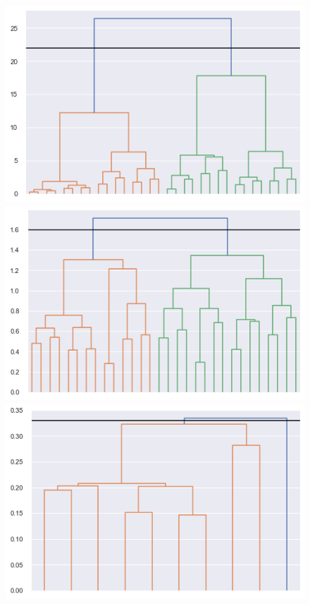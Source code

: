 \begin{figure}[h!]
	\centering
	\begin{minipage}{.50\textwidth}
		\centering
		\includegraphics[width=\textwidth]{plots/hierarchical/hierarchical_dendogram_ward.png}
	\end{minipage}%
	\begin{minipage}{.50\textwidth}
		\centering
		\includegraphics[width=\textwidth]{plots/hierarchical/hierarchical_dendogram_complete.png}
	\end{minipage}
	\begin{minipage}{.50\textwidth}
		\centering
		\includegraphics[width=\textwidth]{plots/hierarchical/hierarchical_dendogram_single.png}

\end{minipage}
\end{figure}
